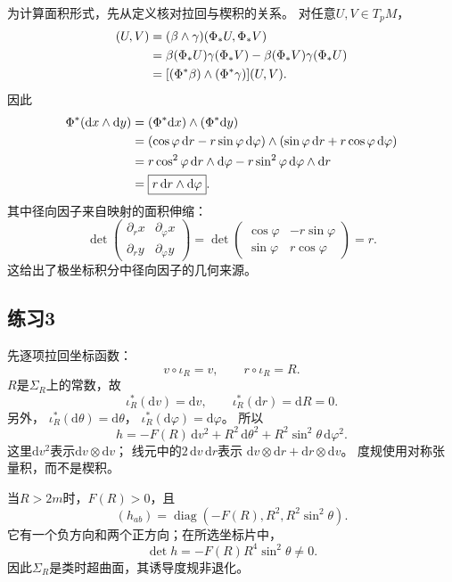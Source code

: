 \documentclass[11pt,a4paper,fontset=fandol]{ctexart}
\newcommand{\dd}{\mathrm{d}}
\begin{document}
为计算面积形式，先从定义核对拉回与楔积的关系。
对任意$U,V\in T_pM$，
\begin{align}
 [\Phi^*(\beta\wedge\gamma)](U,V)
 &=(\beta\wedge\gamma)(\Phi_*U,\Phi_*V)\notag\\
 &=\beta(\Phi_*U)\gamma(\Phi_*V)
   -\beta(\Phi_*V)\gamma(\Phi_*U)\notag\\
 &=[(\Phi^*\beta)\wedge(\Phi^*\gamma)](U,V).
\end{align}
因此
\begin{align}
 \Phi^*(\dd x\wedge\dd y)
 &=(\Phi^*\dd x)\wedge(\Phi^*\dd y)\notag\\
 &=(\cos\varphi\,\dd r-r\sin\varphi\,\dd\varphi)
   \wedge(\sin\varphi\,\dd r+r\cos\varphi\,\dd\varphi)\notag\\
 &=r\cos^2\varphi\,\dd r\wedge\dd\varphi
   -r\sin^2\varphi\,\dd\varphi\wedge\dd r\notag\\
 &=\boxed{r\,\dd r\wedge\dd\varphi}.
\end{align}
其中径向因子来自映射的面积伸缩：
\begin{equation}
 \det\begin{pmatrix}
 \partial_r x&\partial_\varphi x\\
 \partial_r y&\partial_\varphi y
 \end{pmatrix}
 =
 \det\begin{pmatrix}
 \cos\varphi&-r\sin\varphi\\
 \sin\varphi&r\cos\varphi
 \end{pmatrix}=r.
\end{equation}
这给出了极坐标积分中径向因子的几何来源。

\subsection{练习3}
先逐项拉回坐标函数：
\[
 v\circ\iota_R=v,\qquad r\circ\iota_R=R.
\]
$R$是$\Sigma_R$上的常数，故
\[
 \iota_R^*(\dd v)=\dd v,\qquad
 \boxed{\iota_R^*(\dd r)=\dd R=0}.
\]
另外，
$\iota_R^*(\dd\theta)=\dd\theta$，
$\iota_R^*(\dd\varphi)=\dd\varphi$。
所以
\begin{equation}
 \boxed{h=-F(R)\,\dd v^2
       +R^2\,\dd\theta^2+R^2\sin^2\theta\,\dd\varphi^2.}
 \label{eq:induced}
\end{equation}
这里$\dd v^2$表示$\dd v\otimes\dd v$；
线元中的$2\,\dd v\,\dd r$表示
$\dd v\otimes\dd r+\dd r\otimes\dd v$。
度规使用对称张量积，而不是楔积。

当$R>2m$时，$F(R)>0$，且
\[
 (h_{ab})=\operatorname{diag}(-F(R),R^2,R^2\sin^2\theta).
\]
它有一个负方向和两个正方向；在所选坐标片中，
\[
 \det h=-F(R)R^4\sin^2\theta\ne0.
\]
因此$\Sigma_R$是类时超曲面，其诱导度规非退化。
\end{document}
